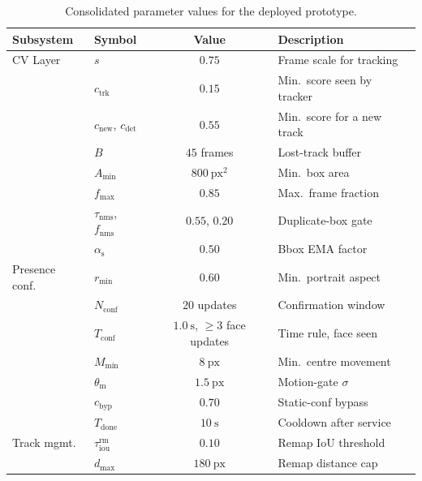 \begin{table}[!htbp]
\centering
\small
\renewcommand{\arraystretch}{0.94}
\caption{Consolidated parameter values for the deployed \sysname{} prototype.}
\label{tab:all-params}
\begin{tabular}{llcl}
\hline
Subsystem & Symbol & Value & Description \\
\hline
CV Layer        & $s$                          & $0.75$               & Frame scale for tracking \\
                & $c_{\mathrm{trk}}$           & $0.15$               & Min.\ score seen by tracker \\
                & $c_{\mathrm{new}}$, $c_{\mathrm{det}}$ & $0.55$     & Min.\ score for a new track \\
                & $B$                          & $45$ frames          & Lost-track buffer \\
                & $A_{\min}$                   & $800\ \mathrm{px}^2$ & Min.\ box area \\
                & $f_{\max}$                   & $0.85$               & Max.\ frame fraction \\
                & $\tau_{\mathrm{nms}}$, $f_{\mathrm{nms}}$ & $0.55$, $0.20$ & Duplicate-box gate \\
                & $\alpha_{\mathrm{s}}$        & $0.50$               & Bbox EMA factor \\
\hline
Presence conf.  & $r_{\min}$                   & $0.60$               & Min.\ portrait aspect \\
                & $N_{\mathrm{conf}}$          & $20$ updates         & Confirmation window \\
                & $T_{\mathrm{conf}}$          & $1.0\ \mathrm{s}$, $\geq 3$ face updates & Time rule, face seen \\
                & $M_{\min}$                   & $8\ \mathrm{px}$     & Min.\ centre movement \\
                & $\theta_{\mathrm{m}}$        & $1.5\ \mathrm{px}$   & Motion-gate $\sigma$ \\
                & $c_{\mathrm{byp}}$           & $0.70$               & Static-conf bypass \\
                & $T_{\mathrm{done}}$          & $10\ \mathrm{s}$    & Cooldown after service \\
\hline
Track mgmt.     & $\tau_{\mathrm{iou}}^{\mathrm{rm}}$ & $0.10$   & Remap IoU threshold \\
                & $d_{\max}$                   & $180\ \mathrm{px}$   & Remap distance cap \\

\end{tabular}
\end{table}
